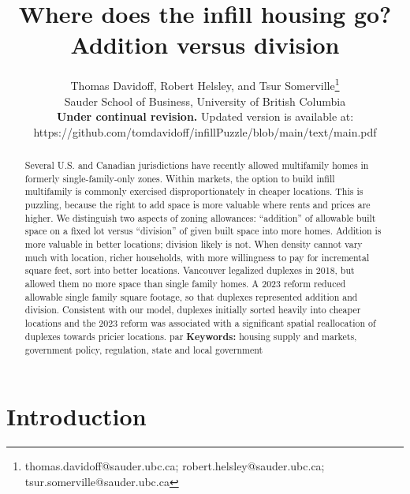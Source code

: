 \documentclass[12pt]{article}
\begin{document}
\title{Where does the infill housing go?\\Addition versus division}
\author{Thomas Davidoff, Robert Helsley, and Tsur Somerville\thanks{thomas.davidoff@sauder.ubc.ca; robert.helsley@sauder.ubc.ca; tsur.somerville@sauder.ubc.ca}\\Sauder School of Business, University of British Columbia\\\textbf{Under continual revision.} Updated version is available at:\\ https://github.com/tomdavidoff/infillPuzzle/blob/main/text/main.pdf}
  \maketitle

\onehalfspacing
\begin{abstract}

Several U.S. and Canadian jurisdictions have recently allowed  multifamily homes in formerly single-family-only zones. Within markets, the option to build infill multifamily is commonly exercised disproportionately in cheaper locations. This is puzzling, because the right to add space is more valuable where rents and prices are higher. We distinguish two aspects of zoning allowances: ``addition'' of allowable built space on a fixed lot versus ``division'' of given built space into more homes. Addition is more valuable in better locations; division likely is not. When density cannot vary much with location, richer households, with more willingness to pay for incremental square feet, sort into better locations. Vancouver legalized duplexes in 2018, but allowed them no more space than single family homes. A 2023 reform reduced allowable single family square footage, so that duplexes represented addition and division. Consistent with our model, duplexes initially sorted heavily into cheaper locations and the 2023 reform was associated with a significant spatial reallocation of duplexes towards pricier locations. 
par\bigskip
\textbf{Keywords:} housing supply and markets, government policy, regulation, state and local government
\end{abstract}

\section{\label{sec:intro}Introduction}
\end{document}
